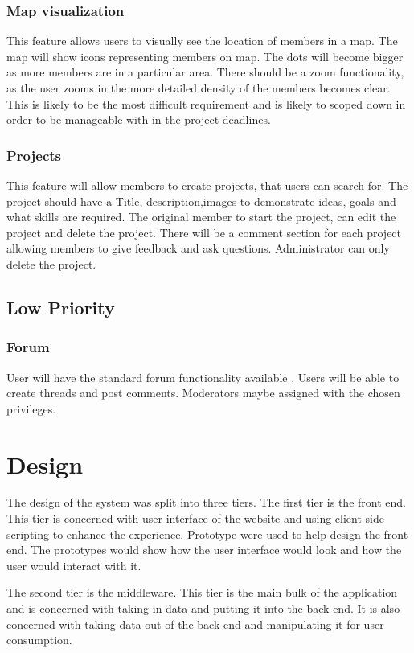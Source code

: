 \documentclass[a4paper,oneside,11pt]{report}
\begin{document}
\subsubsection{Map visualization}
This feature allows users to visually see the location of members in a map. The map will show icons representing members on map. The dots will become bigger as more members are in a particular area. There should be a zoom functionality, as the user zooms in the more detailed density of the members becomes clear. This is likely to be the most difficult requirement and is likely to scoped down in order to be manageable with in the project deadlines.
\subsubsection{Projects}
This feature will allow members to create projects, that users can search for. The project should have a Title, description,images to demonstrate ideas, goals and what skills are required. The original member to start the project, can edit the project and delete the project. There will be a comment section for each project allowing members to give feedback and ask questions. Administrator can only delete the project.
\subsection{Low Priority}
\subsubsection{Forum}
User will have the standard forum functionality available . Users will be able to create threads and post comments. Moderators maybe assigned with the chosen privileges. 
\section{Design}
The design of the system was split into three tiers. The first tier is the front end. This tier is concerned with user interface of the website and using client side scripting to enhance the experience. Prototype were used to help design the front end. The prototypes would show how the user interface would look and how the user would interact with it. 

The second tier is the middleware. This tier is the main bulk of the application and is concerned with taking in data and putting it into the back end. It is also concerned with taking data out of the back end and manipulating it for user consumption. 
\end{document}
